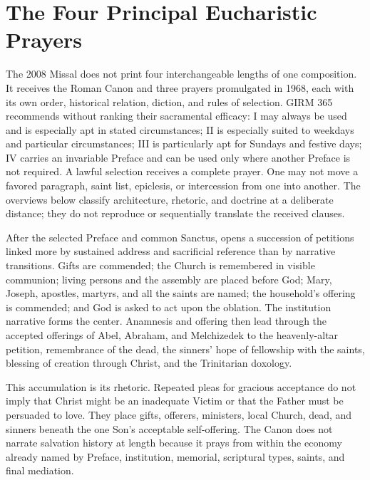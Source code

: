 \section{The Four Principal Eucharistic Prayers}

The 2008 Missal does not print four interchangeable lengths of one composition. It receives the Roman Canon and three prayers promulgated in 1968, each with its own order, historical relation, diction, and rules of selection. GIRM 365 recommends without ranking their sacramental efficacy: I may always be used and is especially apt in stated circumstances; II is especially suited to weekdays and particular circumstances; III is particularly apt for Sundays and festive days; IV carries an invariable Preface and can be used only where another Preface is not required. A lawful selection receives a complete prayer. One may not move a favored paragraph, saint list, epiclesis, or intercession from one into another. The overviews below classify architecture, rhetoric, and doctrine at a deliberate distance; they do not reproduce or sequentially translate the received clauses.


After the selected Preface and common Sanctus,  opens a succession of petitions linked more by sustained address and sacrificial reference than by narrative transitions. Gifts are commended; the Church is remembered in visible communion; living persons and the assembly are placed before God; Mary, Joseph, apostles, martyrs, and all the saints are named; the household's offering is commended; and God is asked to act upon the oblation. The institution narrative forms the center. Anamnesis and offering then lead through the accepted offerings of Abel, Abraham, and Melchizedek to the heavenly-altar petition, remembrance of the dead, the sinners' hope of fellowship with the saints, blessing of creation through Christ, and the Trinitarian doxology.

This accumulation is its rhetoric. Repeated pleas for gracious acceptance do not imply that Christ might be an inadequate Victim or that the Father must be persuaded to love. They place gifts, offerers, ministers, local Church, dead, and sinners beneath the one Son's acceptable self-offering. The Canon does not narrate salvation history at length because it prays from within the economy already named by Preface, institution, memorial, scriptural types, saints, and final mediation.


